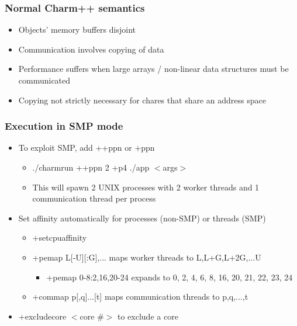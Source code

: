 \begin{frame}[fragile]
  \frametitle{Normal Charm++ semantics}
  \begin{itemize}
    \item Objects' memory buffers disjoint
    \item Communication involves copying of data
    \item Performance suffers when large arrays / non-linear data structures must be communicated
    \item Copying not strictly necessary for chares that share an address space
  \end{itemize}
\end{frame}

\begin{frame}[fragile]
  \frametitle{Execution in SMP mode}
    \begin{itemize}
      \item To exploit SMP, add ++ppn or +ppn
      \begin{itemize}
        \item ./charmrun ++ppn 2 +p4 ./app $<$args$>$
        \item This will spawn 2 UNIX processes with 2 worker threads and 1 communication thread per process
      \end{itemize}
      \item Set affinity automatically for processes (non-SMP) or threads (SMP)
      \begin{itemize}
        \item +setcpuaffinity
        \item +pemap L[-U][:G],... maps worker threads to L,L+G,L+2G,...U
        \begin{itemize}
          \item +pemap 0-8:2,16,20-24 expands to 0, 2, 4, 6, 8, 16, 20, 21, 22, 23, 24
        \end{itemize}
        \item +commap p[,q]...[t] maps communication threads to p,q,...,t
      \end{itemize}
      \item +excludecore $<$core \#$>$ to exclude a core
    \end{itemize}
\end{frame}

